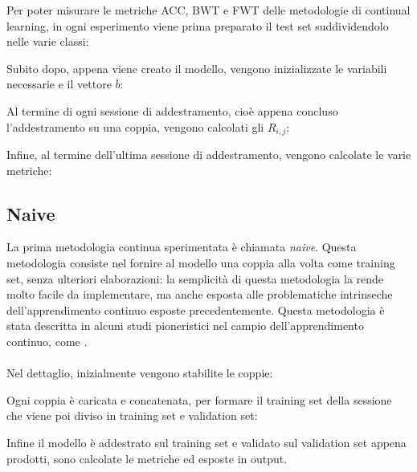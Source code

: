 Per poter misurare le metriche ACC, BWT e FWT delle metodologie di continual learning, in ogni esperimento viene prima preparato il test set suddividendolo nelle varie classi:


Subito dopo, appena viene creato il modello, vengono inizializzate le variabili necessarie e il vettore $\overline{b}$:

Al termine di ogni sessione di addestramento, cioè appena concluso l'addestramento su una coppia, vengono calcolati gli $R_{i,j}$:

Infine, al termine dell'ultima sessione di addestramento, vengono calcolate le varie metriche:


\subsection{Naive}
La prima metodologia continua sperimentata è chiamata \textit{naive}. Questa metodologia consiste nel fornire al modello una coppia alla volta come training set, senza ulteriori elaborazioni: la semplicità di questa metodologia la rende molto facile da implementare, ma anche esposta alle problematiche intrinseche dell'apprendimento continuo esposte precedentemente. Questa metodologia è stata descritta in alcuni studi pioneristici nel campio dell'apprendimento continuo, come \cite{Ring2004CHILDAF}.\\\\
Nel dettaglio, inizialmente vengono stabilite le coppie:

Ogni coppia è caricata e concatenata, per formare il training set della sessione che viene poi diviso in training set e validation set:



Infine il modello è addestrato sul training set e validato sul validation set appena prodotti, sono calcolate le metriche ed esposte in output.

